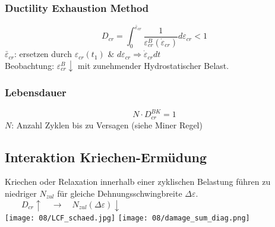         \subsubsection{Ductility Exhaustion Method}
            \[D_{cr}=\int_0^{\bar{\varepsilon}_{cr}}\frac{1}{\varepsilon_{cr}^B(\dot{\varepsilon}_{cr})}d\varepsilon_{cr}< 1\]
            $\bar{\varepsilon}_{cr}$: ersetzen durch $\varepsilon_{cr}(t_1)$ \& $d\varepsilon_{cr} \Rightarrow \dot{\varepsilon}_{cr}dt$
            \\Beobachtung: $\varepsilon_{cr}^{B}\downarrow$ mit zunehmender Hydrostatischer Belast.
        \subsubsection{Lebensdauer}
            \[N\cdot D_{cr}^{BK} = 1\]
            $N$: Anzahl Zyklen bis zu Versagen (siehe Miner Regel)
    \subsection{Interaktion Kriechen-Ermüdung}
        Kriechen oder Relaxation innerhalb einer zyklischen Belastung führen zu niedriger $N_{zul}$ für gleiche Dehnungsschwingbreite $\Delta\varepsilon$. $\qquad D_{cr}\uparrow \quad\rightarrow\quad N_{zul}(\Delta\varepsilon)\downarrow$\\
            \texttt{[image: 08/LCF\_schaed.jpg]}
            \texttt{[image: 08/damage\_sum\_diag.png]}
        